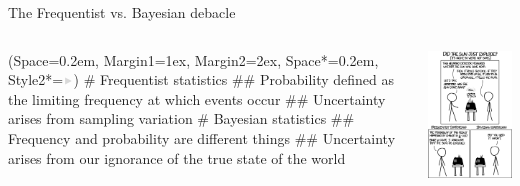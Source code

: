 \documentclass[12pt, aspectratio=149]{beamer}
\newcommand{\listSpace}{0.2em}
\theoremstyle{plain}
\begin{document}
\begin{frame}[fragile]{The Frequentist vs. Bayesian debacle}
	\begin{columns}
		\begin{column}{0.7\linewidth}
			\begin{easylist}
			\ListProperties(Space=\listSpace, Margin1=1ex, Margin2=2ex, Space*=\listSpace, Style2*=$\color{bggraydark}\blacktriangleright$\space)
			# Frequentist statistics
			## Probability defined as the limiting frequency at which events occur
			## Uncertainty arises from sampling variation
			# Bayesian statistics
			## Frequency and probability are different things
			## Uncertainty arises from our ignorance of the true state of the world
			\end{easylist}
		\end{column}
			\begin{column}{0.3\textwidth}
			\includegraphics[height=0.7\textheight]{figs/relevant_xkcd.png}
		\end{column}
	\end{columns}
\end{frame}
\end{document}
